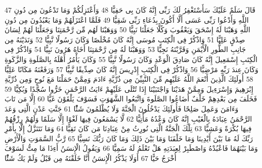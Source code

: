\documentclass[20pt,a4paper]{article}
\begin{document}
{\tiny\colorbox{cl_aya}{47}} قَالَ سَلَمٌ عَلَيْكَ سَأَسْتَغْفِرُ لَكَ رَبِّى إِنَّهُ كَانَ بِى حَفِيًّا
{\tiny\colorbox{cl_aya}{48}} وَأَعْتَزِلُكُمْ وَمَا تَدْعُونَ مِن دُونِ اللَّهِ وَأَدْعُوا رَبِّى عَسَى أَلَّا أَكُونَ بِدُعَاءِ رَبِّى شَقِيًّا
{\tiny\colorbox{cl_aya}{49}} فَلَمَّا اعْتَزَلَهُمْ وَمَا يَعْبُدُونَ مِن دُونِ اللَّهِ وَهَبْنَا لَهُ إِسْحَقَ وَيَعْقُوبَ وَكُلًّا جَعَلْنَا نَبِيًّا
{\tiny\colorbox{cl_aya}{50}} وَوَهَبْنَا لَهُم مِّن رَّحْمَتِنَا وَجَعَلْنَا لَهُمْ لِسَانَ صِدْقٍ عَلِيًّا
{\tiny\colorbox{cl_aya}{51}} وَاذْكُرْ فِى الْكِتَبِ مُوسَى إِنَّهُ كَانَ مُخْلَصًا وَكَانَ رَسُولًا نَّبِيًّا
{\tiny\colorbox{cl_aya}{52}} وَنَدَيْنَهُ مِن جَانِبِ الطُّورِ الْأَيْمَنِ وَقَرَّبْنَهُ نَجِيًّا
{\tiny\colorbox{cl_aya}{53}} وَوَهَبْنَا لَهُ مِن رَّحْمَتِنَا أَخَاهُ هَرُونَ نَبِيًّا
{\tiny\colorbox{cl_aya}{54}} وَاذْكُرْ فِى الْكِتَبِ إِسْمَعِيلَ إِنَّهُ كَانَ صَادِقَ الْوَعْدِ وَكَانَ رَسُولًا نَّبِيًّا
{\tiny\colorbox{cl_aya}{55}} وَكَانَ يَأْمُرُ أَهْلَهُ بِالصَّلَوةِ وَالزَّكَوةِ وَكَانَ عِندَ رَبِّهِ مَرْضِيًّا
{\tiny\colorbox{cl_aya}{56}} وَاذْكُرْ فِى الْكِتَبِ إِدْرِيسَ إِنَّهُ كَانَ صِدِّيقًا نَّبِيًّا
{\tiny\colorbox{cl_aya}{57}} وَرَفَعْنَهُ مَكَانًا عَلِيًّا
{\tiny\colorbox{cl_aya}{58}} أُولَئِكَ الَّذِينَ أَنْعَمَ اللَّهُ عَلَيْهِم مِّنَ النَّبِيِّنَ مِن ذُرِّيَّةِ ءَادَمَ وَمِمَّنْ حَمَلْنَا مَعَ نُوحٍ وَمِن ذُرِّيَّةِ إِبْرَهِيمَ وَإِسْرَءِيلَ وَمِمَّنْ هَدَيْنَا وَاجْتَبَيْنَا إِذَا تُتْلَى عَلَيْهِمْ ءَايَتُ الرَّحْمَنِ خَرُّوا سُجَّدًا وَبُكِيًّا
{\tiny\colorbox{cl_aya}{59}} فَخَلَفَ مِن بَعْدِهِمْ خَلْفٌ أَضَاعُوا الصَّلَوةَ وَاتَّبَعُوا الشَّهَوَتِ فَسَوْفَ يَلْقَوْنَ غَيًّا
{\tiny\colorbox{cl_aya}{60}} إِلَّا مَن تَابَ وَءَامَنَ وَعَمِلَ صَلِحًا فَأُولَئِكَ يَدْخُلُونَ الْجَنَّةَ وَلَا يُظْلَمُونَ شَئًْا
{\tiny\colorbox{cl_aya}{61}} جَنَّتِ عَدْنٍ الَّتِى وَعَدَ الرَّحْمَنُ عِبَادَهُ بِالْغَيْبِ إِنَّهُ كَانَ وَعْدُهُ مَأْتِيًّا
{\tiny\colorbox{cl_aya}{62}} لَّا يَسْمَعُونَ فِيهَا لَغْوًا إِلَّا سَلَمًا وَلَهُمْ رِزْقُهُمْ فِيهَا بُكْرَةً وَعَشِيًّا
{\tiny\colorbox{cl_aya}{63}} تِلْكَ الْجَنَّةُ الَّتِى نُورِثُ مِنْ عِبَادِنَا مَن كَانَ تَقِيًّا
{\tiny\colorbox{cl_aya}{64}} وَمَا نَتَنَزَّلُ إِلَّا بِأَمْرِ رَبِّكَ لَهُ مَا بَيْنَ أَيْدِينَا وَمَا خَلْفَنَا وَمَا بَيْنَ ذَلِكَ وَمَا كَانَ رَبُّكَ نَسِيًّا
{\tiny\colorbox{cl_aya}{65}} رَّبُّ السَّمَوَتِ وَالْأَرْضِ وَمَا بَيْنَهُمَا فَاعْبُدْهُ وَاصْطَبِرْ لِعِبَدَتِهِ هَلْ تَعْلَمُ لَهُ سَمِيًّا
{\tiny\colorbox{cl_aya}{66}} وَيَقُولُ الْإِنسَنُ أَءِذَا مَا مِتُّ لَسَوْفَ أُخْرَجُ حَيًّا
{\tiny\colorbox{cl_aya}{67}} أَوَلَا يَذْكُرُ الْإِنسَنُ أَنَّا خَلَقْنَهُ مِن قَبْلُ وَلَمْ يَكُ شَئًْا
\end{document}
